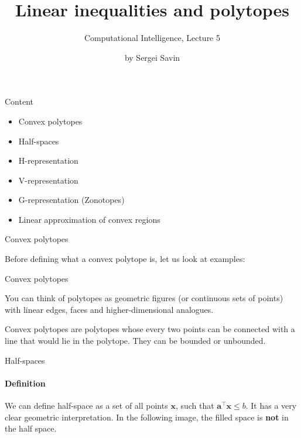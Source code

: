 \documentclass{beamer}
\title{Linear inequalities and polytopes}
\subtitle{Computational Intelligence, Lecture 5}
\author{by Sergei Savin}
\date{\mydate}
\begin{document}
\maketitle


\begin{frame}{Content}

\begin{itemize}
\item Convex polytopes
\item Half-spaces
\item H-representation
\item V-representation
\item G-representation (Zonotopes)
\item Linear approximation of convex regions
\end{itemize}

\end{frame}



\begin{frame}{Convex polytopes}
\begin{flushleft}

Before defining what a convex polytope is, let us look at examples:


 
\end{flushleft}
\end{frame}


\begin{frame}{Convex polytopes}
\begin{flushleft}

You can think of polytopes as geometric figures (or continuous sets of points) with linear edges, faces and higher-dimensional analogues.

\bigskip

\begin{definition}
 Convex polytopes are polytopes whose every two points can be connected with a line that would lie in the polytope. They can be bounded or unbounded.
\end{definition}
 
\end{flushleft}
\end{frame}


\begin{frame}{Half-spaces}
\framesubtitle{Definition}
\begin{flushleft}

We can define half-space as a set of all points $\mathbf{x}$, such that $\mathbf{a}^\top \mathbf{x} \leq b$. It has a very clear geometric interpretation. In the following image, the filled space is \textbf{not} in the half space.


 
\end{flushleft}
\end{frame}
\end{document}
